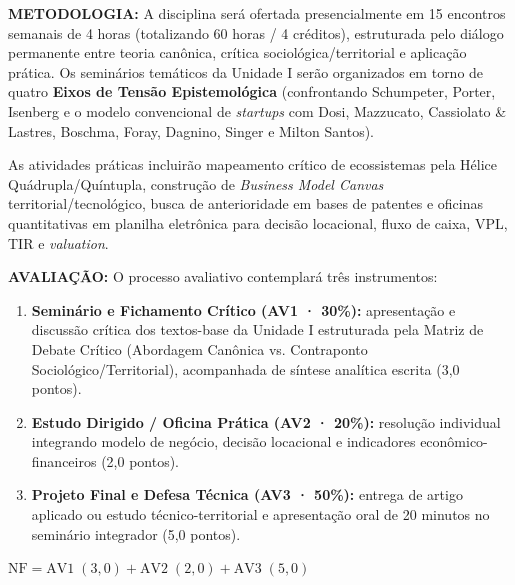 \documentclass[11pt,a4paper]{article}
\begin{document}
\vspace{8pt}
\noindent\textbf{METODOLOGIA:} A disciplina será ofertada presencialmente em 15 encontros semanais de 4 horas (totalizando 60 horas / 4 créditos), estruturada pelo diálogo permanente entre teoria canônica, crítica sociológica/territorial e aplicação prática. Os seminários temáticos da Unidade I serão organizados em torno de quatro \textbf{Eixos de Tensão Epistemológica} (confrontando Schumpeter, Porter, Isenberg e o modelo convencional de \textit{startups} com Dosi, Mazzucato, Cassiolato \& Lastres, Boschma, Foray, Dagnino, Singer e Milton Santos).

As atividades práticas incluirão mapeamento crítico de ecossistemas pela Hélice Quádrupla/Quíntupla, construção de \textit{Business Model Canvas} territorial/tecnológico, busca de anterioridade em bases de patentes e oficinas quantitativas em planilha eletrônica para decisão locacional, fluxo de caixa, VPL, TIR e \textit{valuation}.

\vspace{8pt}
\noindent\textbf{AVALIAÇÃO:} O processo avaliativo contemplará três instrumentos:
\begin{enumerate}
  \item \textbf{Seminário e Fichamento Crítico (AV1 · 30\%):} apresentação e discussão crítica dos textos-base da Unidade I estruturada pela Matriz de Debate Crítico (Abordagem Canônica vs. Contraponto Sociológico/Territorial), acompanhada de síntese analítica escrita (3,0 pontos).
  \item \textbf{Estudo Dirigido / Oficina Prática (AV2 · 20\%):} resolução individual integrando modelo de negócio, decisão locacional e indicadores econômico-financeiros (2,0 pontos).
  \item \textbf{Projeto Final e Defesa Técnica (AV3 · 50\%):} entrega de artigo aplicado ou estudo técnico-territorial e apresentação oral de 20 minutos no seminário integrador (5,0 pontos).
\end{enumerate}

\begin{center}
  $\mathrm{NF} = \mathrm{AV1}\;(3{,}0) + \mathrm{AV2}\;(2{,}0) + \mathrm{AV3}\;(5{,}0)$
\end{center}
\end{document}
